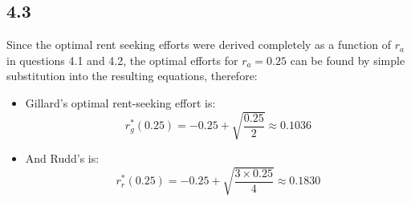 \documentclass{article}
\begin{document}
\subsection*{4.3}
Since the optimal rent seeking efforts were derived completely as a function of $r_{a}$ in questions 4.1 and 4.2, the optimal efforts for $r_{a} = 0.25$ can be found by simple substitution into the resulting equations, therefore:
\begin{itemize}
    \item Gillard's optimal rent-seeking effort is:
    $$r_{g}^{*}(0.25) = -0.25 + \sqrt{\frac{0.25}{2}} \approx 0.1036$$
    \item And Rudd's is:
    $$r_{r}^{*}(0.25) = -0.25 + \sqrt{\frac{3 \times 0.25}{4}} \approx 0.1830$$
\end{itemize}
\end{document}

